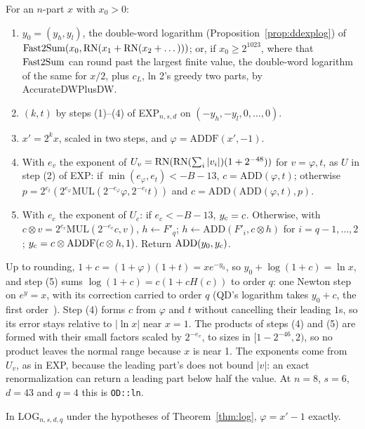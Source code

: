  For an $n$-part $x$ with $x_0 > 0$:
\begin{enumerate}
\item[(1)] $y_0 = (y_h, y_l)$, the double-word logarithm (Proposition~\ref{prop:ddexplog}) of $\mathrm{Fast2Sum}(x_0, \mathrm{RN}(x_1
  + \mathrm{RN}(x_2 + \dots)))$; or, if $x_0 \ge 2^{1023}$, where that $\mathrm{Fast2Sum}$ can round past the largest finite value,
  the double-word logarithm of the same for $x/2$, plus $c_L$, ln 2's greedy two parts, by AccurateDWPlusDW.
\item[(2)] $(k, t)$ by steps (1)--(4) of EXP$_{n,s,d}$ on $(-y_h, -y_l, 0, \dots, 0)$.
\item[(3)] $x' = 2^kx$, scaled in two steps, and $\varphi = \mathrm{ADDF}(x', -1)$.
\item[(4)] With $e_v$ the exponent of $U_v = \mathrm{RN}(\mathrm{RN}(\sum_i|v_i|)(1 + 2^{-48}))$ for $v = \varphi, t$, as $U$ in step (2) of
  EXP: if $\min(e_\varphi, e_t) < -B - 13$, $c = \mathrm{ADD}(\varphi, t)$; otherwise $p = 2^{e_t}(2^{e_\varphi}\mathrm{MUL}(2^{-e_\varphi}\varphi,
  2^{-e_t}t))$ and $c = \mathrm{ADD}(\mathrm{ADD}(\varphi, t), p)$.
\item[(5)] With $e_c$ the exponent of $U_c$: if $e_c < -B - 13$, $y_{\rm c} = c$. Otherwise, with $c \otimes v =
  2^{e_c}\mathrm{MUL}(2^{-e_c}c, v)$, $h \gets F'_q$; $h \gets \mathrm{ADD}(F'_i, c \otimes h)$ for $i = q-1,
  \dots, 2$; $y_{\rm c} = c \otimes \mathrm{ADDF}(c \otimes h, 1)$. Return $\mathrm{ADD}(y_0, y_{\rm c})$.
\end{enumerate}
Up to rounding, $1 + c = (1 + \varphi)(1 + t) = xe^{-y_0}$, so $y_0 + \log(1 + c) = \ln x$, and step (5) sums $\log(1 + c) =
c(1 + cH(c))$ to order $q$: one Newton step on $e^y = x$, with its correction carried to order $q$ (QD's logarithm
takes $y_0 + c$, the first order~\cite{QD237}). Step (4) forms $c$ from $\varphi$ and $t$ without cancelling their leading
$1$s, so its error stays relative to $|\ln x|$ near $x = 1$. The products of steps (4) and (5) are formed with their
small factors scaled by $2^{-e_v}$, to sizes in $[1 - 2^{-46}, 2)$, so no product leaves the normal range because $x$ is
near 1. The exponents come from $U_v$, as in EXP, because the leading part's does not bound $|v|$: an exact
renormalization can return a leading part below half the value. At $n = 8$, $s = 6$, $d
= 43$ and $q = 4$ this is \texttt{OD::ln}.

\begin{lemma}\label{lem:fexact}
In LOG$_{n,s,d,q}$ under the hypotheses of Theorem~\ref{thm:log}, $\varphi = x' - 1$ exactly.
\end{lemma}

